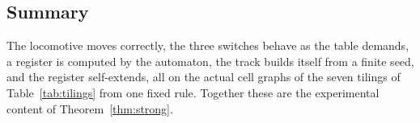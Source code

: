 \subsection{Summary}

The locomotive moves correctly, the three switches behave as the table demands, a register is computed by the
automaton, the track builds itself from a finite seed, and the register self-extends, all on the actual cell
graphs of the seven tilings of Table~\ref{tab:tilings} from one fixed rule. Together these are the experimental
content of Theorem~\ref{thm:strong}.
